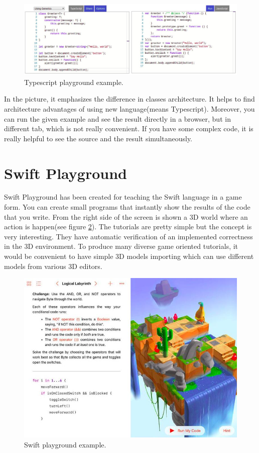 \begin{figure}[h!]
    \centering
    \includegraphics[width=\linewidth]{src/pic/typescript}
    \caption{Typescript playground example.}
    \label{fig:typescript}
\end{figure}

In the picture, it emphasizes the difference in classes architecture. It helps to find architecture advantages of using new language(means Typescript). Moreover, you can run the given example and see the result directly in a browser, but in different tab, which is not really convenient. If you have some complex code, it is really helpful to see the source and the result simultaneously.

\section{Swift Playground}
Swift Playground has been created for teaching the Swift language in a game form. You can create small programs that instantly show the results of the code that you write. From the right side of the screen is shown a 3D world where an action is happen(see figure \ref{fig:swift}). The tutorials are pretty simple but the concept is very interesting. They have automatic verification of an implemented correctness in the 3D environment. To produce many diverse game oriented tutorials, it would be convenient to have simple 3D models importing which can use different models from various 3D editors.

\begin{figure}[h!]
    \centering
    \includegraphics[width=0.6\linewidth]{src/pic/swift}
    \caption{Swift playground example.}
    \label{fig:swift}
\end{figure}


